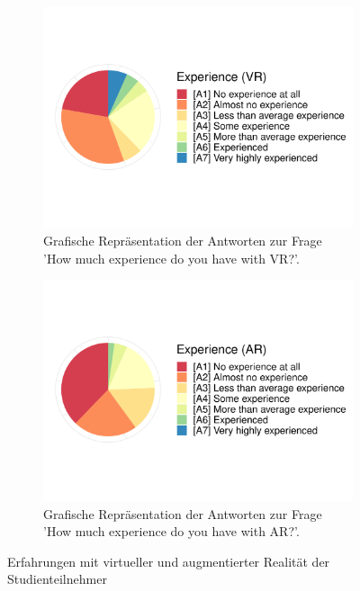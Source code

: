 \begin{figure}
	\begin{subfigure}{0.48\textwidth}
		\includegraphics[width=\textwidth]{./appendices/expVr}
		\caption{Grafische Repräsentation der Antworten zur Frage 'How much experience do you have with VR?'.}
		\label{fig:expVr}
	\end{subfigure}%
	\hfill
	\begin{subfigure}{0.48\textwidth}
		\includegraphics[width=\textwidth]{./appendices/expAr}
		\caption{Grafische Repräsentation der Antworten zur Frage 'How much experience do you have with AR?'.}
		\label{fig:expAr}
	\end{subfigure}
	\caption{Erfahrungen mit virtueller und augmentierter Realität der Studienteilnehmer} %
\end{figure}

